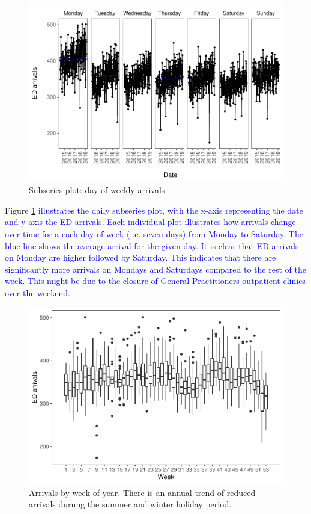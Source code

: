 \documentclass[]{elsarticle} %
\begin{document}
\begin{figure}[H]

{\centering \includegraphics[width=0.7\linewidth]{paper_files/figure-latex/seasonplot-dofw-1} 

}

\caption{Subseries plot: day of weekly arrivals}\label{fig:seasonplot-dofw}
\end{figure}

Figure \ref{fig:seasonplot-dofw} \textcolor{blue}{illustrates the daily subseries plot, with the x-axis representing the date and y-axis the ED arrivals. Each individual plot illustrates how arrivals change over time for a each day of week (i.e. seven days) from Monday to Saturday. The blue line shows the average arrival for the given day. It is clear that ED arrivals on Monday are higher followed by Saturday. This indicates that there are
significantly more arrivals on Mondays and Saturdays compared to the rest of the week. This might be due to the closure of General Practitioners outpatient clinics over the weekend.}

\begin{figure}[H]

{\centering \includegraphics[width=0.7\linewidth]{paper_files/figure-latex/seasonplot-weekofyear-1} 

}

\caption{Arrivals by week-of-year. There is an annual trend of reduced arrivals durnng the summer and winter holiday period.}\label{fig:seasonplot-weekofyear}
\end{figure}
\end{document}
